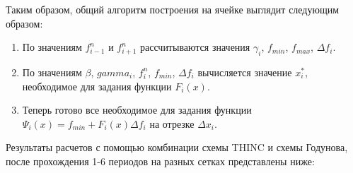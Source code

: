 \documentclass[12pt,a4paper]{article}
\begin{document}
Таким образом, общий алгоритм построения  на ячейке выглядит следующим образом:
\begin{enumerate}
\item По значениям $f_{i-1}^n$ и $f_{i+1}^n$ рассчитываются значения $\gamma_i$, $f_{min}$, $f_{max}$, $\Delta f_i$.
\item По значениям $\beta$, $gamma_i$, $f_i^n$, $f_{min}$, $\Delta f_i$ вычисляется значение $x_i^*$, необходимое для задания функции $F_i(x)$.
\item Теперь готово все необходимое для задания функции $\Psi_i(x)=f_{min}+F_i(x)\Delta f_i$ на отрезке $\Delta x_i$.
\end{enumerate}

Результаты расчетов с помощью комбинации схемы THINC и схемы Годунова, после прохождения 1-6 периодов на разных сетках представлены ниже:
\\
\end{document}
